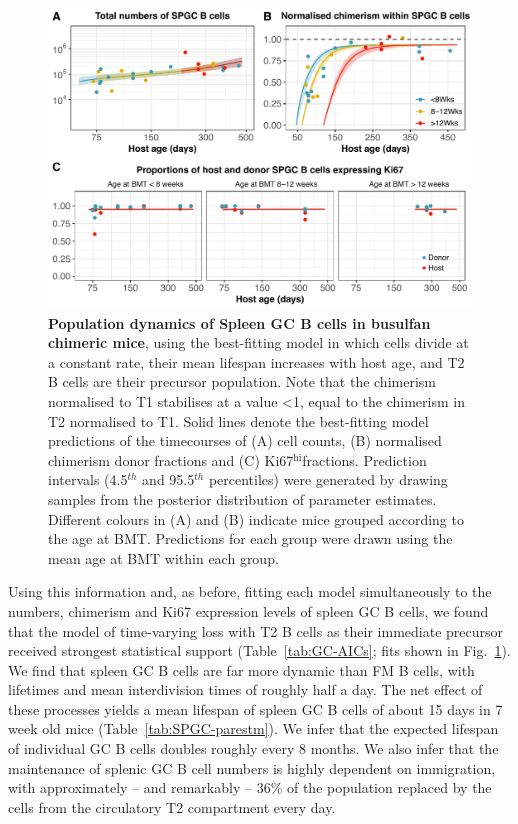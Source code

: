\documentclass[11pt]{article}
\newcommand{\khi}{Ki67$^\text{hi}$}
\newcommand{\looic}{$\Delta$LOO-IC}
\begin{document}
	\begin{figure}[htbp]
		\centerline{\includegraphics[scale = 0.85] {Results_SPGC_T2.pdf}}
		\caption{\textbf{Population dynamics of Spleen GC B cells in busulfan chimeric mice}, using the best-fitting model in which  cells divide at a constant rate, their mean lifespan increases with host age, and T2 B cells are their precursor population. Note that the chimerism normalised to T1 stabilises at a value <1,  equal to the chimerism in T2 normalised to T1. Solid lines denote the  best-fitting model predictions of the  timecourses  of (A) cell counts, (B) normalised chimerism  donor fractions and (C) \khi fractions. Prediction intervals (4.5$^{th}$ and 95.5$^{th}$ percentiles) were generated by drawing samples from the posterior distribution of parameter estimates. Different colours in (A) and (B) indicate mice grouped according to the age at BMT. Predictions for each group were drawn using the mean age at BMT within each group.}
		\label{fig:results_SPGC}
	\end{figure}
    
    
Using this information and, as before, fitting each model simultaneously to the numbers, chimerism and Ki67 expression levels of spleen GC B cells, we found that the model of time-varying loss with T2 B cells as their immediate precursor received strongest statistical support (Table~\ref{tab:GC-AICs}; fits shown in Fig.~\ref{fig:results_SPGC}).  We find that spleen GC B cells are far more dynamic than FM B cells,  with lifetimes and mean interdivision times of roughly half a day. The net effect of these processes yields a mean lifespan of spleen GC B cells of about 15 days in 7 week old mice (Table~\ref{tab:SPGC-parestm}). We infer that the expected lifespan of individual GC B cells doubles roughly every 8 months.
	We also infer that the maintenance of splenic GC B cell numbers is highly dependent on immigration, with approximately -- and remarkably -- 36\% of the population replaced by the cells from the circulatory T2 compartment every day.
	
\end{document}
